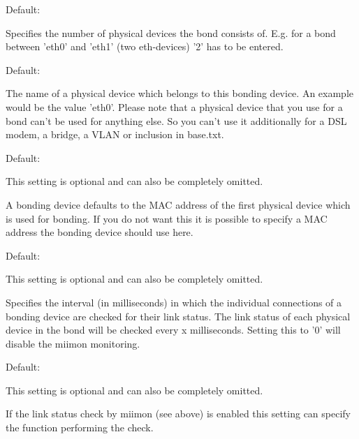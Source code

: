 \begin{description}
  Default: 

  Specifies the number of physical devices the bond consists of. E.g. for 
  a bond between 'eth0' and 'eth1' (two eth-devices) '2' has to be entered.
  

  Default: 

  The name of a physical device which belongs to this bonding device. 
  An example would be the value 'eth0'. Please note that a physical 
  device that you use for a bond can't be used for anything else.
  So you can't use it additionally for a DSL modem, a bridge, a VLAN or 
  inclusion in base.txt.


  Default: 

  This setting is optional and can also be completely omitted.

  A bonding device defaults to the MAC address of the first
  physical device which is used for bonding. If you do not
  want this it is possible to specify a MAC address the
  bonding device should use here.
  


  Default: 

  This setting is optional and can also be completely omitted.

  Specifies the interval (in milliseconds) in which the individual
  connections of a bonding device are checked for their link status. 
  The link status of each physical device in the bond will be checked
  every x milliseconds. Setting this to '0' will disable the miimon 
  monitoring.
  

  Default: 

  This setting is optional and can also be completely omitted.

  If the link status check by miimon (see above) is enabled
  this setting can specify the function performing the check.
  
  \begin{itemize}


\end{itemize}
\end{description}
